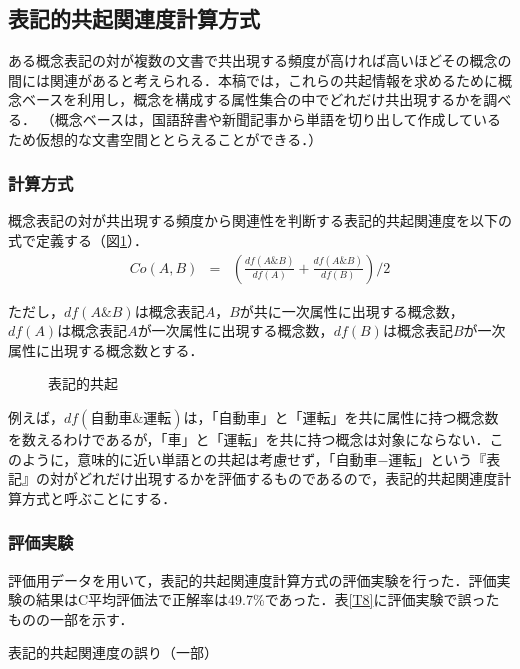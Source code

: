 \subsection{表記的共起関連度計算方式}

ある概念表記の対が複数の文書で共出現する頻度が高ければ高いほどその概念の間には関連があると考えられる．本稿では，これらの共起情報を求めるために概念ベースを利用し，概念を構成する属性集合の中でどれだけ共出現するかを調べる．
（概念ベースは，国語辞書や新聞記事から単語を切り出して作成しているため仮想的な文書空間ととらえることができる．）

\subsubsection{計算方式}

概念表記の対が共出現する頻度から関連性を判断する表記的共起関連度を以下の式で定義する（図\ref{Fig2}）．
\begin{eqnarray}
Co(A,B) &=& \left(\frac{df(A \& B)}{df(A)} + \frac{df(A \& B)}{df(B)} \right)
            / 2
\end{eqnarray}

ただし，$df(A\&B)$は概念表記$A$，$B$が共に一次属性に出現する概念数，$df(A)$は概念表記$A$が一次属性に出現する概念数，$df(B)$は概念表記$B$が一次属性に出現する概念数とする．

\begin{figure}[tb]
\begin{center}
\end{center}
\caption{表記的共起}
\label{Fig2}
\end{figure}

例えば，$df(自動車\&運転)$は，「自動車」と「運転」を共に属性に持つ概念数を数えるわけであるが，「車」と「運転」を共に持つ概念は対象にならない．このように，意味的に近い単語との共起は考慮せず，「自動車−運転」という『表記』の対がどれだけ出現するかを評価するものであるので，表記的共起関連度計算方式と呼ぶことにする．

\subsubsection{評価実験}

評価用データを用いて，表記的共起関連度計算方式の評価実験を行った．評価実験の結果はC平均評価法で正解率は49.7\%であった．表\ref{T8}に評価実験で誤ったものの一部を示す．

\begin{table}[tb]
\caption[]{表記的共起関連度の誤り（一部）}
\label{T8}
\begin{center}
\end{center}
\end{table}

